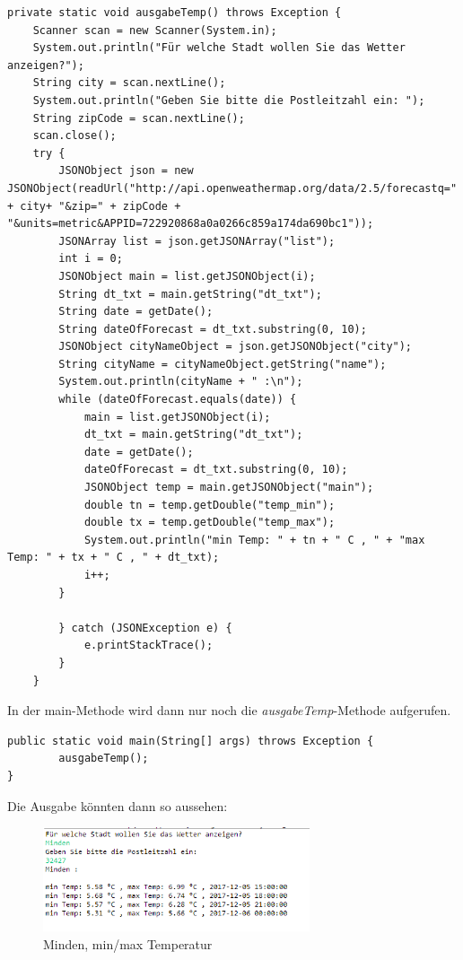 \begin{lstlisting}[caption={ausgabeTemp}]
private static void ausgabeTemp() throws Exception {
	Scanner scan = new Scanner(System.in);
	System.out.println("Für welche Stadt wollen Sie das Wetter anzeigen?");
	String city = scan.nextLine();
	System.out.println("Geben Sie bitte die Postleitzahl ein: ");
	String zipCode = scan.nextLine();
	scan.close();
	try {
		JSONObject json = new JSONObject(readUrl("http://api.openweathermap.org/data/2.5/forecastq=" + city+ "&zip=" + zipCode + "&units=metric&APPID=722920868a0a0266c859a174da690bc1"));
		JSONArray list = json.getJSONArray("list");
		int i = 0;
		JSONObject main = list.getJSONObject(i);
		String dt_txt = main.getString("dt_txt");
		String date = getDate();
		String dateOfForecast = dt_txt.substring(0, 10);
		JSONObject cityNameObject = json.getJSONObject("city");
		String cityName = cityNameObject.getString("name");
		System.out.println(cityName + " :\n");
		while (dateOfForecast.equals(date)) {
			main = list.getJSONObject(i);
			dt_txt = main.getString("dt_txt");
			date = getDate();
			dateOfForecast = dt_txt.substring(0, 10);
			JSONObject temp = main.getJSONObject("main");
			double tn = temp.getDouble("temp_min");
			double tx = temp.getDouble("temp_max");
			System.out.println("min Temp: " + tn + " C , " + "max Temp: " + tx + " C , " + dt_txt);
			i++;
		}

		} catch (JSONException e) {
			e.printStackTrace();
		}
	}
\end{lstlisting}

In der main-Methode wird dann nur noch die \textit{ausgabeTemp}-Methode aufgerufen.

\begin{lstlisting}[caption={main}]
public static void main(String[] args) throws Exception {
		ausgabeTemp();
}
\end{lstlisting}

Die Ausgabe könnten dann so aussehen: 

\begin{figure}[htbp]
\begin{center}
\includegraphics[width=0.7\textwidth]{Bild2}
\caption{Minden, min/max Temperatur}
\end{center}
\end{figure}

